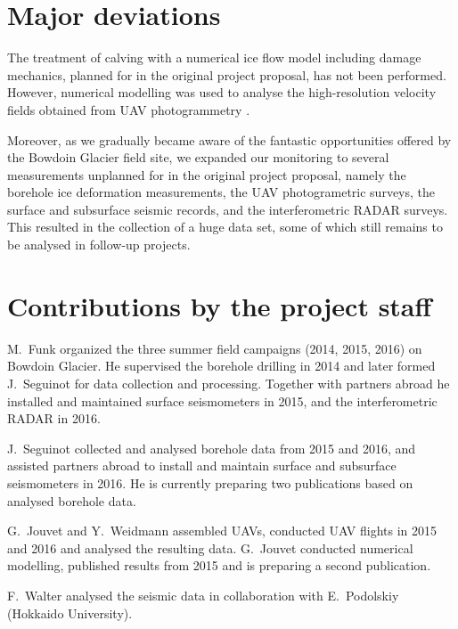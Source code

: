 \documentclass{article}
\begin{document}
\section{Major deviations}

The treatment of calving with a numerical ice flow model including damage
mechanics, planned for in the original project proposal, has not been
performed. However, numerical modelling was used to analyse the high-resolution
velocity fields obtained from UAV photogrammetry \citep{Jouvet.etal.2016}.

Moreover, as we gradually became aware of the fantastic opportunities offered
by the Bowdoin Glacier field site, we expanded our monitoring to several
measurements unplanned for in the original project proposal, namely the
borehole ice deformation measurements, the UAV photogrametric surveys, the
surface and subsurface seismic records, and the interferometric RADAR surveys.
This resulted in the collection of a huge data set, some of which still remains
to be analysed in follow-up projects.


\section{Contributions by the project staff}

M.~Funk organized the three summer field campaigns (2014, 2015, 2016) on
Bowdoin Glacier. He supervised the borehole drilling in 2014 and later formed
J.~Seguinot for data collection and processing. Together with partners abroad
he installed and maintained surface seismometers in 2015, and the
interferometric RADAR in 2016.

J.~Seguinot collected and analysed borehole data from 2015 and 2016, and
assisted partners abroad to install and maintain surface and subsurface
seismometers in 2016. He is currently preparing two publications based on
analysed borehole data.

G.~Jouvet and Y.~Weidmann assembled UAVs, conducted UAV flights in 2015 and
2016 and analysed the resulting data. G.~Jouvet conducted numerical modelling,
published results from 2015 and is preparing a second publication.

F.~Walter analysed the seismic data in collaboration with E.~Podolskiy
(Hokkaido University).
\end{document}
